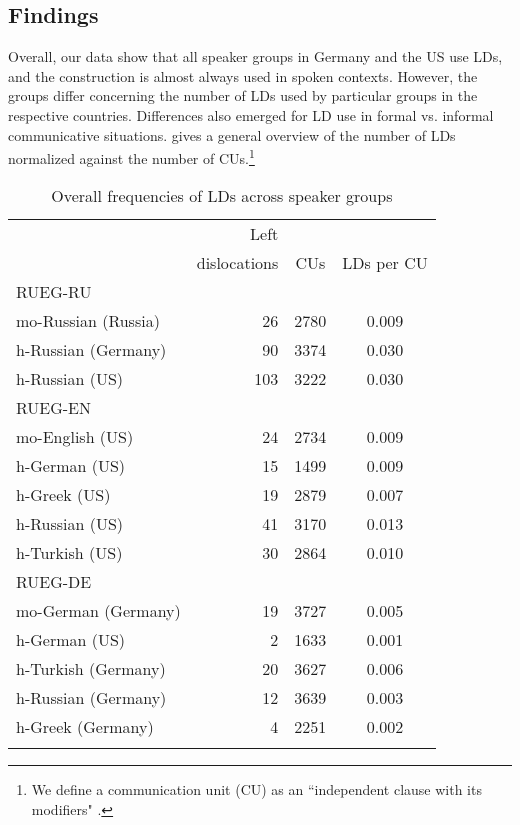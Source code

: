 \documentclass[output=paper,colorlinks,citecolor=brown]{langscibook}
\begin{document}
\subsection{Findings}
\largerpage
Overall, our data show that all speaker groups in Germany and the US use LDs, and the construction is almost always used in spoken contexts. However, the groups differ concerning the number of LDs used by particular groups in the respective countries. Differences also emerged for LD use in formal vs. informal communicative situations.  gives a general overview of the number of LDs normalized against the number of CUs.\footnote{ We define a communication unit (CU) as an “independent clause with its modifiers" \citep[53]{hughes_guide_1997}.} 

 \begin{table}
 \label{tab:bunk:frequencies_of_LDs}
   \caption{Overall frequencies of LDs across speaker groups}
  \label{bunk:lds-cus-ru}
 \begin{tabular}{lrcc}
 \lsptoprule 
    &  Left & \\
    &  dislocations  & CUs & LDs per CU \\ 
   \midrule
   RUEG-RU & \\
   mo-Russian (Russia)  & 26   & 2780 & 0.009  \\
   h-Russian (Germany)  & 90   & 3374 & 0.030  \\
   h-Russian (US)       & 103  & 3222 & 0.030 \\
   \midrule
   RUEG-EN & \\
   mo-English (US)  & 24 & 2734 & 0.009   \\
   h-German (US)    & 15 & 1499 & 0.009   \\
   h-Greek (US)     & 19 & 2879 & 0.007  \\
   h-Russian (US)   & 41 & 3170 & 0.013 \\
   h-Turkish (US)   & 30 & 2864 & 0.010 \\
   \midrule
   RUEG-DE & \\
   mo-German (Germany)   & 19   & 3727   & 0.005   \\
   h-German (US)  & 2 & 1633    & 0.001  \\
   h-Turkish (Germany)    & 20 & 3627   & 0.006  \\
   h-Russian (Germany) & 12 & 3639  & 0.003  \\
   h-Greek (Germany)  & 4 & 2251  & 0.002  \\
\lspbottomrule
\end{tabular}
\end{table}
\end{document}
